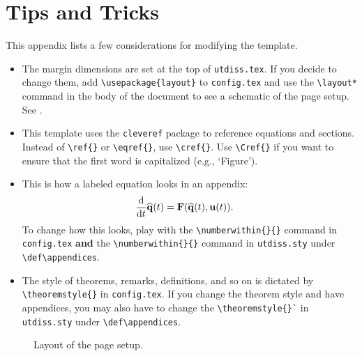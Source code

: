 \chapter{Tips and Tricks}
\label{appendix:tips}

This appendix lists a few considerations for modifying the template.

\begin{itemize}
\item The margin dimensions are set at the top of \texttt{utdiss.tex}. If you decide to change them, add \verb"\usepackage{layout}" to \texttt{config.tex} and use the \verb"\layout*" command in the body of the document to see a schematic of the page setup.
See .

\item This template uses the \texttt{cleveref} package to reference equations and sections.
Instead of \verb"\ref{}" or \verb"\eqref{}", use \verb"\cref{}".
Use \verb"\Cref{}" if you want to ensure that the first word is capitalized (e.g., `Figure').

\item This is how a labeled equation looks in an appendix:
\begin{align}
    \frac{\textup{d}}{\textup{d}t}\widehat{\mathbf{q}}(t)
    &= \mathbf{F}(\widehat{\mathbf{q}}(t), \mathbf{u}(t)).
\end{align}
To change how this looks, play with the \verb"\numberwithin{}{}" command in \texttt{config.tex} \textbf{and} the \verb"\numberwithin{}{}" command in \texttt{utdiss.sty} under \verb"\def\appendices".

\item The style of theorems, remarks, definitions, and so on is dictated by \verb"\theoremstyle{}" in \texttt{config.tex}.
If you change the theorem style and have appendices, you may also have to change the \verb"\theoremstyle{}`" in \texttt{utdiss.sty} under \verb"\def\appendices".
\end{itemize}

\newpage
\begin{figure}[t]
    \centering
    \layout*
    \vspace{.75in}
    \caption{Layout of the page setup.}
    \label{figure:layout}
\end{figure}

